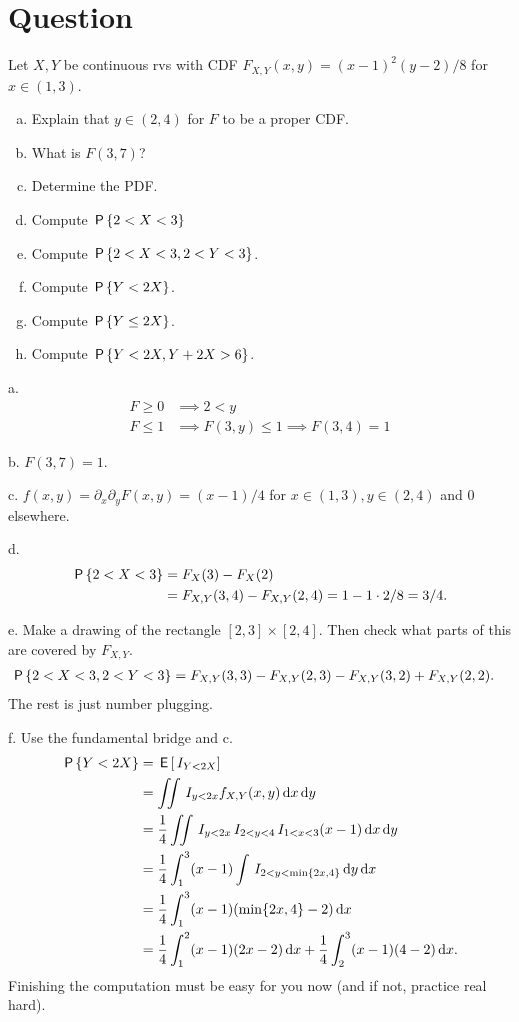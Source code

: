 \section{Question}

\begin{exercise}
Let $X, Y$ be continuous rvs with CDF $F_{X,Y}(x,y) = (x-1)^{2}(y-2)/8$ for $x \in (1, 3)$.
\begin{enumerate}[a.]
\item Explain that $y\in (2,4)$ for  $F$ to be a proper CDF.
\item What is $F(3,7)$?
\item Determine the PDF.
\item Compute $\P{2< X < 3}$
\item Compute $\P{2< X < 3, 2<Y<3}$.
\item Compute $\P{Y< 2X}$.
\item Compute $\P{Y\leq  2X}$.
\item Compute $\P{Y< 2X, Y+2X > 6}$.
\end{enumerate}
\begin{solution}
a.
\begin{align}
\label{eq:11}
F \geq 0 &\implies 2<y\\
F \leq 1 &\implies F(3, y)\leq 1 \implies F(3,4)=1
\end{align}

b. $F(3,7) = 1$.

c. $f(x,y) = \partial_{x} \partial_{y} F(x,y) = (x-1)/4$ for $x\in(1,3), y\in(2,4)$ and $0$ elsewhere.

d.
\begin{align}
\P{2 < X < 3}
&= F_{X}(3) - F_{X}(2) \\
&= F_{X,Y}(3, 4) - F_{X,Y}(2,4) = 1 - 1\cdot 2/8 = 3/4.
\end{align}

e.
Make a drawing of the rectangle $[2,3]\times[2,4]$. Then check what parts of this are covered by $F_{X,Y}$.
\begin{align}
\P{2 < X < 3, 2 < Y < 3}
&= F_{X,Y}(3, 3) - F_{X,Y}(2,3)  - F_{X,Y}(3, 2) + F_{X,Y}(2,2).
\end{align}
The rest is just number plugging.


f.
Use the fundamental bridge and c.
\begin{align}
\P{Y< 2 X}
&= \E{\1{Y < 2 X}} \\
&= \iint \1{y < 2 x} f_{X,Y}(x,y) \d x \d y\\
&= \frac{1}{4}\iint \1{y < 2 x} \1{2< y <4} \1{1<x<3} (x-1) \d x \d y\\
&= \frac{1}{4}\int_{1}^{3} (x-1) \int \1{2<y < \min\{2 x,4\}}  \d y \d x \\
&= \frac{1}{4}\int_{1}^{3} (x-1) (\min\{2 x,4\}-2) \d x \\
&= \frac{1}{4}\int_{1}^{2} (x-1) (2 x-2) \d x
+ \frac{1}{4}\int_{2}^{3} (x-1) (4-2) \d x.
\end{align}
Finishing the computation must be easy for you now (and if not, practice real hard).


\end{solution}
\end{exercise}
